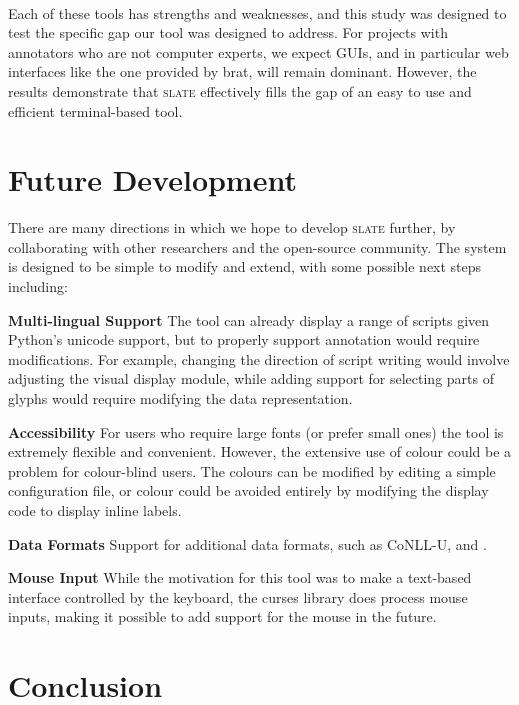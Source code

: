 \documentclass[11pt,a4paper]{article}
\newcommand{\tightparagraph}[1]{\noindent\textbf{#1}}
\newcommand\slate{\textsc{slate}\xspace}
\begin{document}
\paragraph{}
Each of these tools has strengths and weaknesses, and this study was designed to test the specific gap our tool was designed to address.
For projects with annotators who are not computer experts, we expect GUIs, and in particular web interfaces like the one provided by brat, will remain dominant.
However, the results demonstrate that \slate effectively fills the gap of an easy to use and efficient terminal-based tool.

\section{Future Development}

There are many directions in which we hope to develop \slate further, by collaborating with other researchers and the open-source community.
The system is designed to be simple to modify and extend, with some possible next steps including:

\tightparagraph{Multi-lingual Support}
The tool can already display a range of scripts given Python's unicode support, but to properly support annotation would require modifications.
For example, changing the direction of script writing would involve adjusting the visual display module, while adding support for selecting parts of glyphs would require modifying the data representation.

\tightparagraph{Accessibility}
For users who require large fonts (or prefer small ones) the tool is extremely flexible and convenient.
However, the extensive use of colour could be a problem for colour-blind users.
The colours can be modified by editing a simple configuration file, or colour could be avoided entirely by modifying the display code to display inline labels.

\tightparagraph{Data Formats}
Support for additional data formats, such as CoNLL-U, and \citet{data-iso}.

\tightparagraph{Mouse Input}
While the motivation for this tool was to make a text-based interface controlled by the keyboard, the curses library does process mouse inputs, making it possible to add support for the mouse in the future.

\section{Conclusion}
\end{document}
